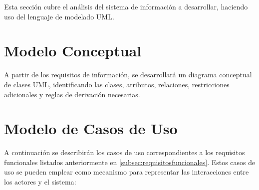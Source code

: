 


Esta sección cubre el análisis del sistema de información a desarrollar, haciendo uso del lenguaje de modelado UML.

\section{Modelo Conceptual}
A partir de los requisitos de información, se desarrollará un diagrama conceptual de clases UML, identificando las clases, atributos, relaciones, restricciones adicionales y reglas de derivación necesarias.



\section{Modelo de Casos de Uso}

A continuación se describirán los casos de uso correspondientes a los requisitos funcionales listados anteriormente en \ref{subsec:requisitosfuncionales}. Estos casos de uso se pueden emplear como mecanismo para representar las interacciones entre los actores y el sistema:
\\

